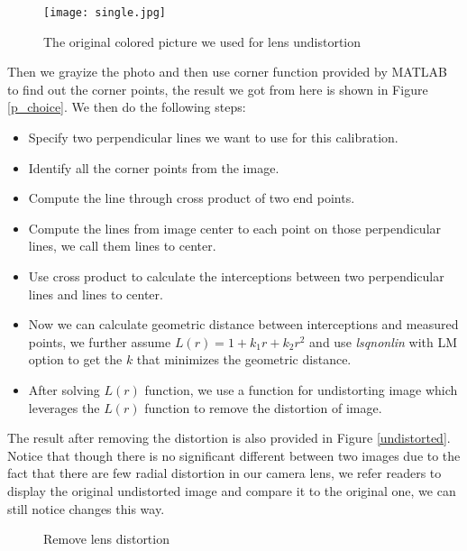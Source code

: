 \documentclass[conference]{IEEEtran}
\begin{document}
\begin{figure}[htbp]
\begin{center}
\texttt{[image: single.jpg]} 
\end{center}	   
\caption{The original colored picture we used for lens undistortion}\label{single}
\end{figure}

Then we grayize the photo and then use corner function provided by MATLAB to find out the corner points, the result we got from here is shown in Figure \ref{p_choice}. We then do the following steps:
\begin{itemize}
	\item Specify two perpendicular lines we want to use for this calibration.
	\item Identify all the corner points from the image.
	\item Compute the line through cross product of two end points.
	\item Compute the lines from image center to each point on those perpendicular lines, we call them lines to center.
	\item Use cross product to calculate the interceptions between two perpendicular lines and lines to center.
	\item Now we can calculate geometric distance between interceptions and measured points, we further assume $L(r) = 1 + k_1r + k_2r^2$ and use \emph{lsqnonlin} with LM option to get the $k$ that minimizes the geometric distance.
	\item After solving $L(r)$ function, we use a function for undistorting image which leverages the $L(r)$ function to remove the distortion of image.
\end{itemize}
The result after removing the distortion is also provided in Figure \ref{undistorted}. Notice that though there is no significant different between two images due to the fact that there are few radial distortion in our camera lens, we refer readers to display the original undistorted image and compare it to the original one, we can still notice changes this way.
\begin{figure*}[!hbpt]
  \caption{Remove lens distortion}
  \label{remove_distort} %
\end{figure*}
\end{document}
